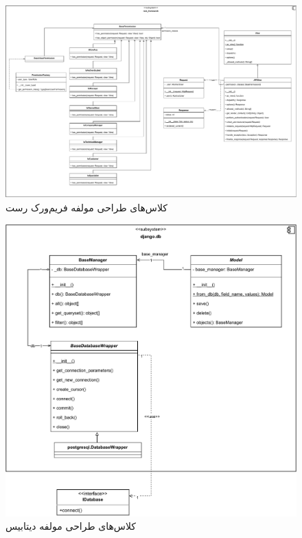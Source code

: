 \eject \pdfpagewidth=16in \pdfpageheight=12in
\begin{figure}[ht!]
	\centering
	\includegraphics[scale=0.8]{figs/design-class/rest.pdf}
	\caption{کلاس‌های طراحی مولفه فریم‌ورک رست}
\end{figure}
\FloatBarrier
\newpage

\recalctypearea

\begin{figure}[ht!]
	\centering
	\includegraphics[scale=0.8]{figs/design-class/db.pdf}
	\caption{کلاس‌های طراحی مولفه دیتابیس}
\end{figure}
\FloatBarrier
\newpage

